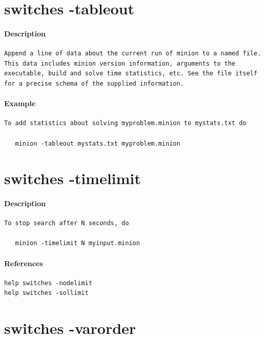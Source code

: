 \documentclass[oneside]{book}
\begin{document}
\section{switches -tableout}
\paragraph{Description}
{\footnotesize
\begin{verbatim}
Append a line of data about the current run of minion to a named file.
This data includes minion version information, arguments to the
executable, build and solve time statistics, etc. See the file itself
for a precise schema of the supplied information.
\end{verbatim}
}
\paragraph{Example}
{\footnotesize
\begin{verbatim}
To add statistics about solving myproblem.minion to mystats.txt do

   minion -tableout mystats.txt myproblem.minion
\end{verbatim}
}
\section{switches -timelimit}
\paragraph{Description}
{\footnotesize
\begin{verbatim}
To stop search after N seconds, do

   minion -timelimit N myinput.minion
\end{verbatim}
}
\paragraph{References}
{\footnotesize
\begin{verbatim}
help switches -nodelimit
help switches -sollimit
\end{verbatim}
}
\section{switches -varorder}
\end{document}
